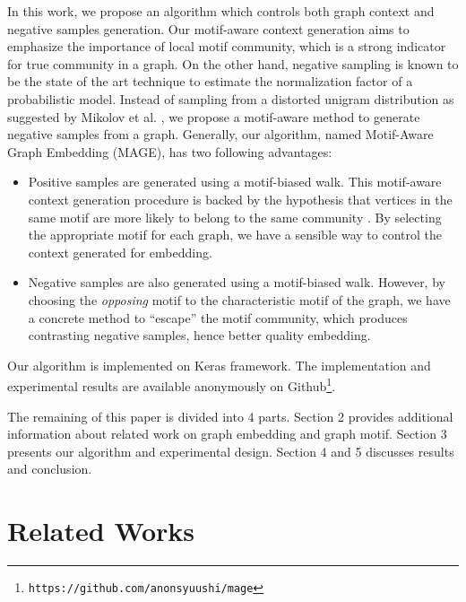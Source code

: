 \documentclass[letterpaper]{article}
\begin{document}
        In this work, we propose an algorithm which controls both graph context and negative samples
        generation. Our motif-aware context generation aims to emphasize the importance of local
        motif community, which is a strong indicator for true community in a graph. On the other hand,
        negative sampling is known to be the state of the art technique to estimate the normalization
        factor of a probabilistic model. Instead of sampling from a distorted unigram distribution as
        suggested by Mikolov et al. \cite{skipgram}, we propose a motif-aware method to generate 
        negative samples from a graph. Generally, our algorithm, named Motif-Aware Graph Embedding (MAGE),
        has two following advantages:

        \begin{itemize}
            \setlength{\parskip}{0pt}
            \item Positive samples are generated using a motif-biased walk. This motif-aware context 
                generation procedure is backed by the hypothesis that vertices in the same motif
                are more likely to belong to the same community \cite{juremotif,harvardmotif}.
                By selecting the appropriate motif for each graph, we have a sensible way to control
                the context generated for embedding.
            \item Negative samples are also generated using a motif-biased walk. However, by choosing
                the \emph{opposing} motif to the characteristic motif of the graph, we have a concrete
                method to ``escape'' the motif community, which produces contrasting negative
                samples, hence better quality embedding.
        \end{itemize}

        Our algorithm is implemented on Keras \cite{keras} framework. The implementation and experimental
        results are available anonymously on Github\footnote{\texttt{https://github.com/anonsyuushi/mage}}.

        The remaining of this paper is divided into 4 parts. Section 2 provides additional information
        about related work on graph embedding and graph motif. Section 3 presents our algorithm and
        experimental design. Section 4 and 5 discusses results and conclusion.

    \section{Related Works}
\end{document}
